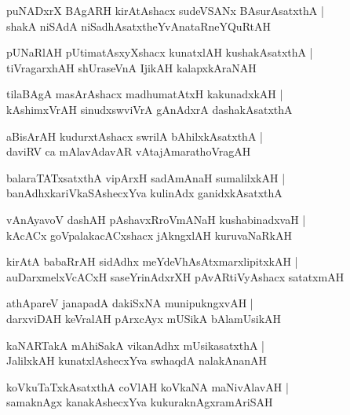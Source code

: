 \documentclass[twoside,12pt,openright]{book}
\newcounter{shloka}[chapter]
\begin{document}
\begin{shloka}
puNADxrX BAgARH kirAtAshacx sudeVSANx BAsurAsatxthA |\\
shakA niSAdA niSadhAsatxtheYvAnataRneYQuRtAH
\end{shloka}

\begin{shloka}
pUNaRlAH pUtimatAsxyXshacx kunatxlAH kushakAsatxthA |\\
tiVragarxhAH shUraseVnA IjikAH kalapxkAraNAH
\end{shloka}

\begin{shloka}
tilaBAgA masArAshacx madhumatAtxH kakunadxkAH |\\
kAshimxVrAH sinudxswviVrA gAnAdxrA dashakAsatxthA
\end{shloka}

\begin{shloka}
aBisArAH kudurxtAshacx swrilA bAhilxkAsatxthA |\\
daviRV ca mAlavAdavAR vAtajAmarathoVragAH
\end{shloka}

\begin{shloka}
balaraTATxsatxthA vipArxH sadAmAnaH sumalilxkAH |\\
banAdhxkariVkaSAshecxYva kulinAdx ganidxkAsatxthA
\end{shloka}

\begin{shloka}
vAnAyavoV dashAH pAshavxRroVmANaH kushabinadxvaH |\\
kAcACx goVpalakacACxshacx jAkngxlAH kuruvaNaRkAH
\end{shloka}

\begin{shloka}
kirAtA babaRrAH sidAdhx meYdeVhAsAtxmarxlipitxkAH |\\
auDarxmelxVcACxH saseYrinAdxrXH pAvARtiVyAshacx satatxmAH 
\end{shloka}

\begin{shloka}
athApareV janapadA dakiSxNA munipukngxvAH |\\
darxviDAH keVralAH pArxcAyx mUSikA bAlamUsikAH
\end{shloka}

\begin{shloka}
kaNARTakA mAhiSakA vikanAdhx mUsikasatxthA |\\
JalilxkAH kunatxlAshecxYva swhaqdA nalakAnanAH
\end{shloka}

\begin{shloka}
koVkuTaTxkAsatxthA coVlAH koVkaNA maNivAlavAH |\\
samaknAgx kanakAshecxYva kukuraknAgxramAriSAH
\end{shloka}
\end{document}
